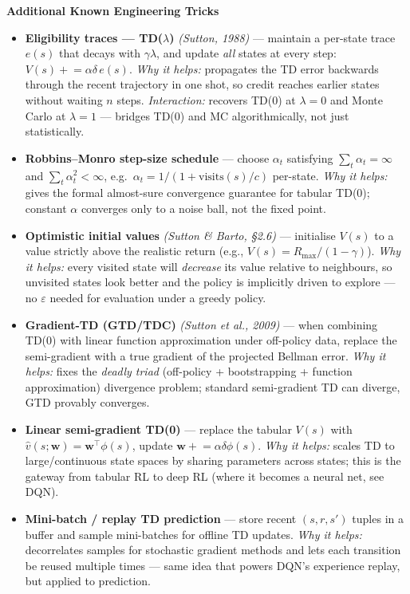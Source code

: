\documentclass[11pt]{article}
\begin{document}
    \label{tricks-2-2}

    \textbf{Additional Known Engineering Tricks}

\begin{itemize}
\item
  \label{trick-2-2-1}\textbf{Eligibility traces ---
  TD(\(\lambda\))} \emph{(Sutton, 1988)} --- maintain a per-state trace
  \(e(s)\) that decays with \(\gamma\lambda\), and update \emph{all}
  states at every step: \(V(s)\mathrel{+}=\alpha\delta\,e(s)\).
  \emph{Why it helps:} propagates the TD error backwards through the
  recent trajectory in one shot, so credit reaches earlier states
  without waiting \(n\) steps. \emph{Interaction:} recovers TD(0) at
  \(\lambda=0\) and Monte Carlo at \(\lambda=1\) --- bridges TD(0) and
  MC algorithmically, not just statistically.
\item
  \label{trick-2-2-2}\textbf{Robbins--Monro step-size
  schedule} --- choose \(\alpha_t\) satisfying
  \(\sum_t \alpha_t = \infty\) and \(\sum_t \alpha_t^2 < \infty\),
  e.g.~\(\alpha_t = 1/(1+\text{visits}(s)/c)\) per-state. \emph{Why it
  helps:} gives the formal almost-sure convergence guarantee for tabular
  TD(0); constant \(\alpha\) converges only to a noise ball, not the
  fixed point.
\item
  \label{trick-2-2-3}\textbf{Optimistic initial values}
  \emph{(Sutton \& Barto, §2.6)} --- initialise \(V(s)\) to a value
  strictly above the realistic return (e.g.,
  \(V(s)=R_\text{max}/(1-\gamma)\)). \emph{Why it helps:} every visited
  state will \emph{decrease} its value relative to neighbours, so
  unvisited states look better and the policy is implicitly driven to
  explore --- no \(\varepsilon\) needed for evaluation under a greedy
  policy.
\item
  \label{trick-2-2-4}\textbf{Gradient-TD (GTD/TDC)}
  \emph{(Sutton et al., 2009)} --- when combining TD(0) with linear
  function approximation under off-policy data, replace the
  semi-gradient with a true gradient of the projected Bellman error.
  \emph{Why it helps:} fixes the \emph{deadly triad} (off-policy +
  bootstrapping + function approximation) divergence problem; standard
  semi-gradient TD can diverge, GTD provably converges.
\item
  \label{trick-2-2-5}\textbf{Linear semi-gradient TD(0)}
  --- replace the tabular \(V(s)\) with
  \(\hat v(s;\mathbf{w}) = \mathbf{w}^\top \phi(s)\), update
  \(\mathbf{w}\mathrel{+}=\alpha\delta\phi(s)\). \emph{Why it helps:}
  scales TD to large/continuous state spaces by sharing parameters
  across states; this is the gateway from tabular RL to deep RL (where
  it becomes a neural net, see DQN).
\item
  \label{trick-2-2-6}\textbf{Mini-batch / replay TD
  prediction} --- store recent \((s,r,s')\) tuples in a buffer and
  sample mini-batches for offline TD updates. \emph{Why it helps:}
  decorrelates samples for stochastic gradient methods and lets each
  transition be reused multiple times --- same idea that powers DQN's
  experience replay, but applied to prediction.
\end{itemize}
\end{document}
